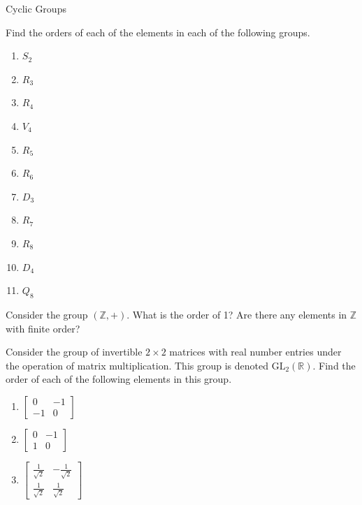 \begin{section}{Cyclic Groups}
\begin{exercise}\label{exer:computing_orders}
Find the orders of each of the elements in each of the following groups.
\begin{enumerate}[label=\rm{(\alph*)}]
\item $S_2$
\item $R_3$
\item $R_4$
\item $V_4$
\item $R_5$
\item $R_6$
\item $D_3$
\item $R_7$
\item $R_8$
\item $D_4$
\item $Q_8$
\end{enumerate}
\end{exercise}

\begin{exercise}
Consider the group $(\mathbb{Z},+)$.  What is the order of 1?  Are there any elements in $\mathbb{Z}$ with finite order?
\end{exercise}

\begin{exercise}
Consider the group of invertible $2\times 2$ matrices with real number entries under the operation of matrix multiplication.  This group is denoted $\mathrm{GL}_2(\mathbb{R})$.  Find the order of each of the following elements in this group.
\begin{multicols}{3}
\begin{enumerate}[label=\rm{(\alph*)}]
\item $\begin{bmatrix} 0 & -1\\ -1 & 0\end{bmatrix}$
\item $\begin{bmatrix} 0 & -1\\ 1 & 0\end{bmatrix}$
\item $\begin{bmatrix} \frac{1}{\sqrt{2}} & -\frac{1}{\sqrt{2}}\\ \frac{1}{\sqrt{2}} & \frac{1}{\sqrt{2}}\end{bmatrix}$
\end{enumerate}
\end{multicols}
\end{exercise}


\end{section}
